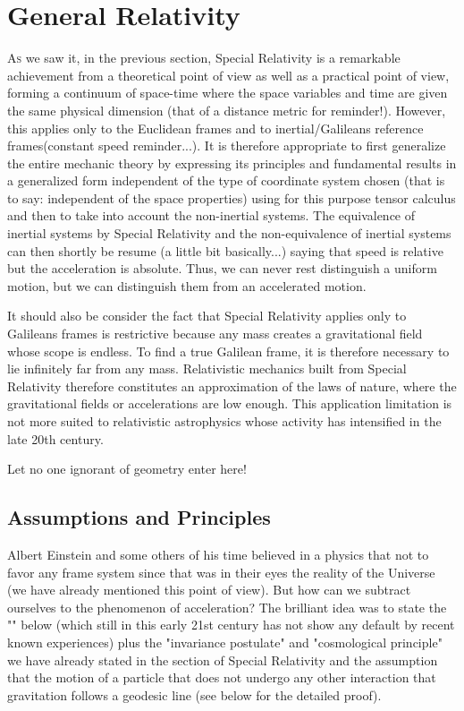 	\section{General Relativity}\label{general relativity}
	\lettrine[lines=4]{\color{BrickRed}A}s we saw it, in the previous section, Special Relativity is a remarkable achievement from a theoretical point of view as well as a practical point of view, forming a continuum of space-time where the space variables and time are given the same physical dimension (that of a distance metric for reminder!). However, this applies only to the Euclidean frames and to inertial/Galileans reference frames(constant speed reminder...). It is therefore appropriate to first generalize the entire mechanic theory by expressing its principles and fundamental results in a generalized form independent of the type of coordinate system chosen (that is to say: independent of the space properties) using for this purpose tensor calculus and then to take into account the non-inertial systems. The equivalence of inertial systems by Special Relativity and the non-equivalence of inertial systems can then shortly be resume (a little bit basically...) saying that speed is relative but the acceleration is absolute. Thus, we can never rest distinguish a uniform motion, but we can distinguish them from an accelerated motion.
	
	It should also be consider the fact that Special Relativity applies only to Galileans frames is restrictive because any mass creates a gravitational field whose scope is endless. To find a true Galilean frame, it is therefore necessary to lie infinitely far from any mass. Relativistic mechanics built from Special Relativity therefore constitutes an approximation of the laws of nature, where the gravitational fields or accelerations are low enough. This application limitation is not  more suited to relativistic astrophysics whose activity has intensified in the late 20th century.
	\begin{fquote}[]Let no one ignorant of geometry enter here!
 	\end{fquote}
	\subsection{Assumptions and Principles}
	Albert Einstein and some others of his time believed in a physics that not to favor any frame system since that was in their eyes the reality of the Universe (we have already mentioned this point of view). But how can we subtract ourselves to the phenomenon of  acceleration? The brilliant idea was to state the "" below (which still in this early 21st century has not show any default by recent known experiences) plus the "invariance postulate" and "cosmological principle" we have already stated in the section of Special Relativity and the assumption that the motion of a particle that does not undergo any other interaction that gravitation follows a geodesic line (see below for the detailed proof).
	
